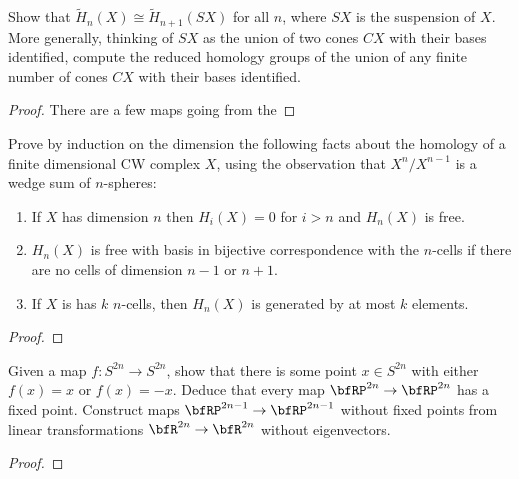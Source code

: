 \begin{problem}[Hatcher {\S}2.1, Ex.\@ 20]
Show that $\widetilde H_n(X)\cong\widetilde H_{n+1}(SX)$ for all $n$, where
$SX$ is the suspension of $X$. More generally, thinking of $SX$ as the
union of two cones $CX$ with their bases identified, compute the reduced
homology groups of the union of any finite number of cones $CX$ with their
bases identified.
\end{problem}
\begin{proof}
There are a few maps going from the
\end{proof}
\newpage

\begin{problem}[Hatcher {\S}2.1, Ex.\@ 22]
Prove by induction on the dimension the following facts about the homology
of a finite dimensional CW complex $X$, using the observation that
$X^n/X^{n-1}$ is a wedge sum of $n$-spheres:
\begin{enumerate}[label=(\alph*)]
\item If $X$ has dimension $n$ then $H_i(X)=0$ for $i>n$ and $H_n(X)$ is
  free.
\item $H_n(X)$ is free with basis in bijective correspondence with the
  $n$-cells if there are no cells of dimension $n-1$ or $n+1$.
\item If $X$ is has $k$ $n$-cells, then $H_n(X)$ is generated by at most
  $k$ elements.
\end{enumerate}
\end{problem}
\begin{proof}
\end{proof}
\newpage

\begin{problem}[Hatcher {\S}2.2, Ex.\@ 2]
Given a map $f\colon S^{2n}\to S^{2n}$, show that there is some point $x\in
S^{2n}$ with either $f(x)=x$ or $f(x)=-x$. Deduce that every map
$\bfRP^{2n}\to\bfRP^{2n}$ has a fixed point. Construct maps
$\bfRP^{2n-1}\to\bfRP^{2n-1}$ without fixed points from linear
transformations $\bfR^{2n}\to\bfR^{2n}$ without eigenvectors.
\end{problem}
\begin{proof}
\end{proof}

